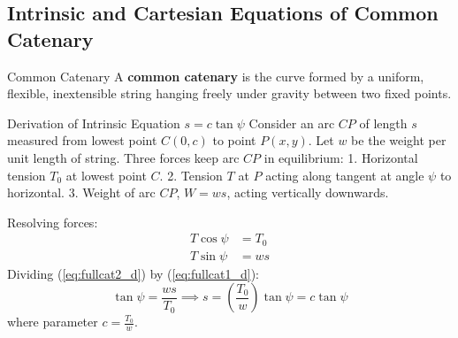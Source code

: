 \documentclass[11pt,a4paper]{article}
\begin{document}
\subsection{Intrinsic and Cartesian Equations of Common Catenary}

\begin{definitionbox}{Common Catenary}
A \textbf{common catenary} is the curve formed by a uniform, flexible, inextensible string hanging freely under gravity between two fixed points.
\end{definitionbox}

\begin{center}
\end{center}

\begin{proofbox}{Derivation of Intrinsic Equation $s = c \tan\psi$}
Consider an arc $CP$ of length $s$ measured from lowest point $C(0,c)$ to point $P(x,y)$.
Let $w$ be the weight per unit length of string.
Three forces keep arc $CP$ in equilibrium:
1. Horizontal tension $T_0$ at lowest point $C$.
2. Tension $T$ at $P$ acting along tangent at angle $\psi$ to horizontal.
3. Weight of arc $CP$, $W = w s$, acting vertically downwards.

Resolving forces:
\begin{align}
T \cos\psi &= T_0 \label{eq:fullcat1_d} \\
T \sin\psi &= w s \label{eq:fullcat2_d}
\end{align}
Dividing (\ref{eq:fullcat2_d}) by (\ref{eq:fullcat1_d}):
\[
\tan\psi = \frac{ws}{T_0} \implies s = \left(\frac{T_0}{w}\right) \tan\psi = c \tan\psi
\]
where parameter $c = \frac{T_0}{w}$.
\end{proofbox}
\end{document}
